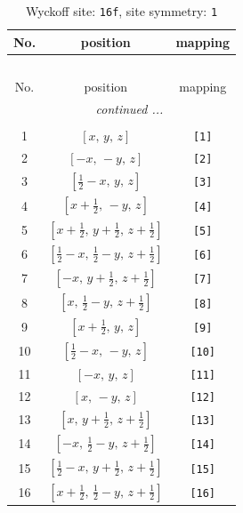\documentclass[fleqn,8pt]{jsarticle}
\begin{document}
\begin{longtable}{ccc}
\caption{Wyckoff site: {\tt 16f}, site symmetry: {\tt 1}}
 \\
 \hline \hline
No. & position & mapping \\ \hline \endfirsthead

\multicolumn{2}{l}{\tablename\ \thetable{}} \\
 \hline \hline
No. & position & mapping \\ \hline \endhead

 \hline \hline
\multicolumn{2}{r}{\footnotesize\it continued ...} \\ \endfoot

 \hline \hline
\multicolumn{2}{r}{} \\ \endlastfoot

1 & $\left[ x,\, y,\, z \right]$ & {\tt [1]} \\ \hline
2 & $\left[ - x,\, - y,\, z \right]$ & {\tt [2]} \\ \hline
3 & $\left[ \frac{1}{2} - x,\, y,\, z \right]$ & {\tt [3]} \\ \hline
4 & $\left[ x + \frac{1}{2},\, - y,\, z \right]$ & {\tt [4]} \\ \hline
5 & $\left[ x + \frac{1}{2},\, y + \frac{1}{2},\, z + \frac{1}{2} \right]$ & {\tt [5]} \\ \hline
6 & $\left[ \frac{1}{2} - x,\, \frac{1}{2} - y,\, z + \frac{1}{2} \right]$ & {\tt [6]} \\ \hline
7 & $\left[ - x,\, y + \frac{1}{2},\, z + \frac{1}{2} \right]$ & {\tt [7]} \\ \hline
8 & $\left[ x,\, \frac{1}{2} - y,\, z + \frac{1}{2} \right]$ & {\tt [8]} \\ \hline
9 & $\left[ x + \frac{1}{2},\, y,\, z \right]$ & {\tt [9]} \\ \hline
10 & $\left[ \frac{1}{2} - x,\, - y,\, z \right]$ & {\tt [10]} \\ \hline
11 & $\left[ - x,\, y,\, z \right]$ & {\tt [11]} \\ \hline
12 & $\left[ x,\, - y,\, z \right]$ & {\tt [12]} \\ \hline
13 & $\left[ x,\, y + \frac{1}{2},\, z + \frac{1}{2} \right]$ & {\tt [13]} \\ \hline
14 & $\left[ - x,\, \frac{1}{2} - y,\, z + \frac{1}{2} \right]$ & {\tt [14]} \\ \hline
15 & $\left[ \frac{1}{2} - x,\, y + \frac{1}{2},\, z + \frac{1}{2} \right]$ & {\tt [15]} \\ \hline
16 & $\left[ x + \frac{1}{2},\, \frac{1}{2} - y,\, z + \frac{1}{2} \right]$ & {\tt [16]} \\
\end{longtable}
\end{document}
